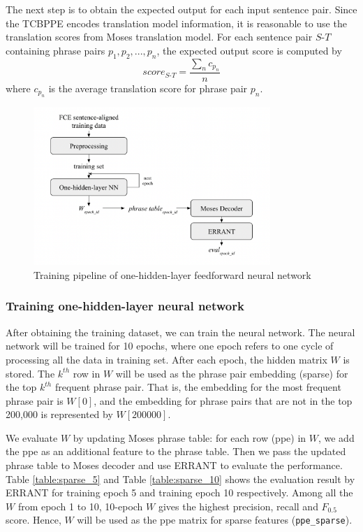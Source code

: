 \documentclass[12pt,a4paper,twoside,openright]{report}
\begin{document}
The next step is to obtain the expected output for each input sentence pair. Since the TCBPPE encodes translation model information, it is reasonable to use the translation scores from Moses translation model. For each sentence pair $S\textrm{-}T$ containing phrase pairs $p_1, p_2, ..., p_n$, the expected output score is computed by
\[ score_{S\textrm{-}T} = \frac{\sum_n c_{p_n}}{n} \]
where $c_{p_n}$ is the average translation score for phrase pair $p_n$.

\begin{figure}[ht]
\centering
\includegraphics[width=0.8\textwidth]{images/sparse_pipeline.png}
\caption{Training pipeline of one-hidden-layer feedforward neural network}
\label{fig:sparse_pipeline}
\end{figure}

\subsubsection{Training one-hidden-layer neural network}

After obtaining the training dataset, we can train the neural network. The neural network will be trained for 10 epochs, where one epoch refers to one cycle of processing all the data in training set. After each epoch, the hidden matrix $W$ is stored. The $k^{th}$ row in $W$ will be used as the phrase pair embedding (sparse) for the top $k^{th}$ frequent phrase pair. That is, the embedding for the most frequent phrase pair is $W[0]$, and the embedding for phrase pairs that are not in the top 200,000 is represented by $W[200000]$.

We evaluate $W$ by updating Moses phrase table: for each row (ppe) in $W$, we add the ppe as an additional feature to the phrase table. Then we pass the updated phrase table to Moses decoder and use ERRANT to evaluate the performance. Table \ref{table:sparse_5} and Table \ref{table:sparse_10} shows the evaluation result by ERRANT for training epoch 5 and training epoch 10 respectively. Among all the $W$ from epoch 1 to 10, 10-epoch $W$ gives the highest precision, recall and $F_{0.5}$ score. Hence, $W$ will be used as the ppe matrix for sparse features (\texttt{ppe\_sparse}).
\end{document}
